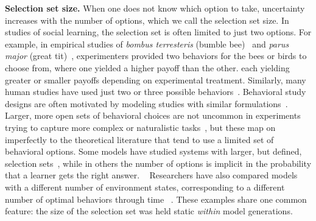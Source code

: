 \documentclass[letterpaper,11.5pt]{scrartcl}
\newcommand{\mt}[1]{{\textcolor{myorange} {({\tiny MT:} #1)}}}
\newcommand{\cm}[1]{{\textcolor{mypurple} {({\tiny CM:} #1)}}}
\begin{document}
\textbf{Selection set size.}
When one does not know which option to take, uncertainty increases with the number of options, which we call the selection set size.
In studies of social learning, the selection set is often limited
to just two options.  For example, in empirical studies of \emph{bombus
terresteris} (bumble bee)~\cite{Baracchi2018} and \emph{parus major} (great
tit)~\cite{Aplin2017}, experimenters provided two behaviors for the bees or birds
to choose from, where one yielded a higher payoff than the other. %
each yielding greater or smaller payoffs depending on experimental treatment.
Similarly, many human studies have used just two or three possible
behaviors~\cite{McElreath2005,Toyokawa2019}. Behavioral study designs are
often motivated by modeling studies with similar formulations~\cite{Rogers1988,boyd1995does,
perreault2012bayesian}.
Larger, more open sets of behavioral
choices are not uncommon in experiments trying to capture more complex or
naturalistic tasks~\cite{derex2013, wasielewski2014}, but these map on
imperfectly to the theoretical literature that tend to use a limited set of behavioral options.
Some models have studied systems with
larger, but defined, selection sets~\cite{Rendell2010}, while in others the
number of options is implicit in the probability that a learner gets the right answer.
~\cite{Enquist2007} 
Researchers have also compared models with a different number
of environment states, corresponding to a different number of optimal behaviors
through time ~\cite{Feldman1996}. These examples share one common feature: 
the size of the selection set was held static \emph{within} model generations.
\end{document}
